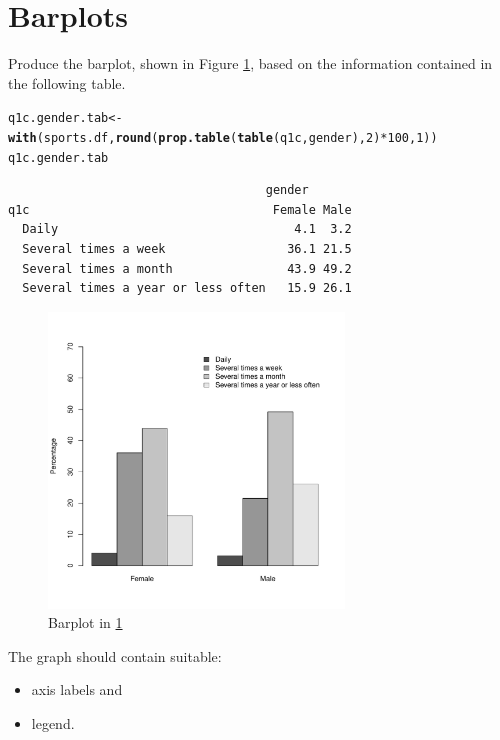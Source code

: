 \documentclass[12pt,a4paper]{article}\usepackage[]{graphicx}\usepackage[]{color}
\makeatletter
\newcommand{\hlnum}[1]{\textcolor[rgb]{0.686,0.059,0.569}{#1}}%
\newcommand{\hlopt}[1]{\textcolor[rgb]{0,0,0}{#1}}%
\newcommand{\hlstd}[1]{\textcolor[rgb]{0.345,0.345,0.345}{#1}}%
\newcommand{\hlkwb}[1]{\textcolor[rgb]{0.69,0.353,0.396}{#1}}%
\newcommand{\hlkwd}[1]{\textcolor[rgb]{0.737,0.353,0.396}{\textbf{#1}}}%
\newenvironment{kframe}{%
 \def\at@end@of@kframe{}%
 \ifinner\ifhmode%
  \def\at@end@of@kframe{\end{minipage}}%
  \begin{minipage}{\columnwidth}%
 \fi\fi%
 \def\FrameCommand##1{\hskip\@totalleftmargin \hskip-\fboxsep
 \colorbox{shadecolor}{##1}\hskip-\fboxsep
     \hskip-\linewidth \hskip-\@totalleftmargin \hskip\columnwidth}%
 \MakeFramed {\advance\hsize-\width
   \@totalleftmargin\z@ \linewidth\hsize
   \@setminipage}}%
 {\par\unskip\endMakeFramed%
 \at@end@of@kframe}
\newenvironment{knitrout}{}{} %
\makeatother
\begin{document}
\section{Barplots}
\label{sec:bar}
Produce the barplot, shown in Figure \ref{fig:bar1}, based on the information contained in the following table.
\begin{knitrout}
\color{fgcolor}\begin{kframe}
\begin{alltt}
\hlstd{q1c.gender.tab} \hlkwb{<-} \hlkwd{with}\hlstd{(sports.df,} \hlkwd{round}\hlstd{(}\hlkwd{prop.table}\hlstd{(}\hlkwd{table}\hlstd{(q1c, gender),} \hlnum{2}\hlstd{)}\hlopt{*}\hlnum{100}\hlstd{,} \hlnum{1}\hlstd{))}
\hlstd{q1c.gender.tab}
\end{alltt}
\begin{verbatim}
                                    gender
q1c                                  Female Male
  Daily                                 4.1  3.2
  Several times a week                 36.1 21.5
  Several times a month                43.9 49.2
  Several times a year or less often   15.9 26.1
\end{verbatim}
\end{kframe}
\end{knitrout}
\begin{figure}[h]   
 \centering
\begin{knitrout}
\color{fgcolor}
\includegraphics[width=0.7\textwidth]{figure/bar1-1} 

\end{knitrout}
\caption{Barplot in \ref{sec:bar}}
  \label{fig:bar1}
\end{figure}
The graph should contain suitable:
\begin{itemize}
\item axis labels and
\item legend.
\end{itemize}
\end{document}

